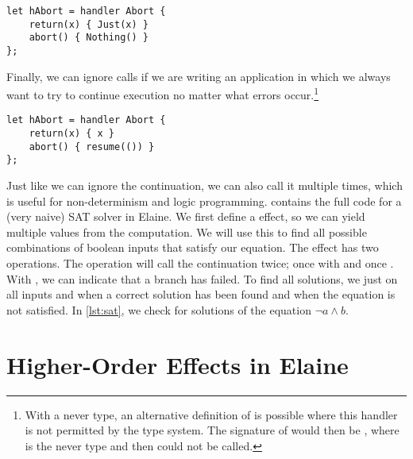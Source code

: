 \begin{lstlisting}[language=elaine, style=fancy]
let hAbort = handler Abort {
    return(x) { Just(x) }
    abort() { Nothing() }
};
\end{lstlisting}

Finally, we can ignore  calls if we are writing an application in which we always want to try to continue execution no matter what errors occur.\footnote{With a never type, an alternative definition of  is possible where this handler is not permitted by the type system. The signature of  would then be , where \el{!} is the never type and then  could not be called.}

\begin{lstlisting}[language=elaine, style=fancy]
let hAbort = handler Abort {
    return(x) { x }
    abort() { resume(()) }
};
\end{lstlisting}

Just like we can ignore the continuation, we can also call it multiple times, which is useful for non-determinism and logic programming.  contains the full code for a (very naive) SAT solver in Elaine. We first define a  effect, so we can yield multiple values from the computation. We will use this to find all possible combinations of boolean inputs that satisfy our equation. The  effect has two operations. The  operation will call the continuation twice; once with  and once . With , we can indicate that a branch has failed. To find all solutions, we just  on all inputs and  when a correct solution has been found and  when the equation is not satisfied. In \cref{lst:sat}, we check for solutions of the equation $\neg a \wedge b$.



\section{Higher-Order Effects in Elaine}

\TODO{}